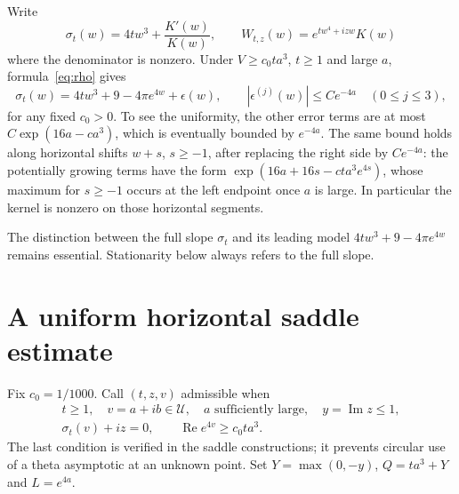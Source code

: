 \documentclass[11pt]{article}
\theoremstyle{remark}\newtheorem{remark}[theorem]{Remark}
\DeclareMathOperator{\Rea}{Re}\DeclareMathOperator{\Ima}{Im}
\begin{document}
Write
\[
 \sigma_t(w)=4tw^3+\frac{K'(w)}{K(w)},\qquad
 W_{t,z}(w)=e^{tw^4+izw}K(w)
\]
where the denominator is nonzero. Under $V\geq c_0ta^3$,
$t\geq1$ and large $a$, formula~\eqref{eq:rho} gives
\begin{equation}\label{eq:slope}
 \sigma_t(w)=4tw^3+9-4\pi e^{4w}+\epsilon(w),\qquad
 |\epsilon^{(j)}(w)|\leq Ce^{-4a}\quad(0\leq j\leq3),
\end{equation}
for any fixed $c_0>0$. To see the uniformity, the other error
terms are at most $C\exp(16a-ca^3)$, which is eventually
bounded by $e^{-4a}$. The same bound holds along horizontal
shifts $w+s$, $s\geq-1$, after replacing the right side by
$Ce^{-4a}$: the potentially growing terms have the form
$\exp(16a+16s-c ta^3e^{4s})$, whose maximum for $s\geq-1$
occurs at the left endpoint once $a$ is large. In particular
the kernel is nonzero on those horizontal segments.

The distinction between the full slope $\sigma_t$ and its
leading model $4tw^3+9-4\pi e^{4w}$ remains essential.
Stationarity below always refers to the full slope.

\section{A uniform horizontal saddle estimate}
Fix $c_0=1/1000$. Call $(t,z,v)$ admissible when
\begin{equation}\label{eq:admissible}
 \begin{gathered}
 t\geq1,\quad v=a+ib\in\mathcal U,\quad a\text{ sufficiently large},
 \quad y=\Ima z\leq1,\\
 \sigma_t(v)+iz=0,\qquad
 \Rea e^{4v}\geq c_0ta^3.
 \end{gathered}
\end{equation}
The last condition is verified in the saddle constructions;
it prevents circular use of a theta asymptotic at an unknown
point. Set $Y=\max(0,-y)$, $Q=ta^3+Y$ and $L=e^{4a}$.
\end{document}
